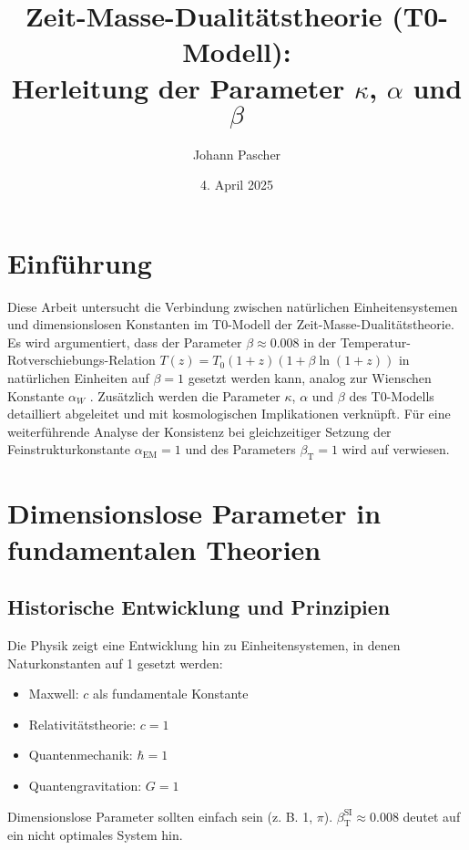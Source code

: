 \documentclass[12pt,a4paper]{article}
\newcommand{\alphaEM}{\alpha_{\text{EM}}}
\newcommand{\betaT}{\beta_{\text{T}}}
\begin{document}
	
	\title{Zeit-Masse-Dualitätstheorie (T0-Modell): \\ Herleitung der Parameter \(\kappa\), \(\alpha\) und \(\beta\)}
	\author{Johann Pascher}
	\date{4. April 2025}
	
	\maketitle
	
	\section*{Einführung}
	
	Diese Arbeit untersucht die Verbindung zwischen natürlichen Einheitensystemen und dimensionslosen Konstanten im T0-Modell der Zeit-Masse-Dualitätstheorie. Es wird argumentiert, dass der Parameter \(\beta \approx 0.008\) in der Temperatur-Rotverschiebungs-Relation \(T(z) = T_0 (1+z)(1+\beta\ln(1+z))\) in natürlichen Einheiten auf \(\beta = 1\) gesetzt werden kann, analog zur Wienschen Konstante \(\alpha_W\) \cite{pascher_temp_2025}. Zusätzlich werden die Parameter \(\kappa\), \(\alpha\) und \(\beta\) des T0-Modells detailliert abgeleitet und mit kosmologischen Implikationen verknüpft. Für eine weiterführende Analyse der Konsistenz bei gleichzeitiger Setzung der Feinstrukturkonstante \(\alphaEM = 1\) und des Parameters \(\betaT = 1\) wird auf \cite{pascher_alphabeta_2025} verwiesen.
	
	\tableofcontents
	\newpage
	
	\section{Dimensionslose Parameter in fundamentalen Theorien}
	
	\subsection{Historische Entwicklung und Prinzipien}
	
	Die Physik zeigt eine Entwicklung hin zu Einheitensystemen, in denen Naturkonstanten auf 1 gesetzt werden:
	\begin{itemize}
		\item Maxwell: \(c\) als fundamentale Konstante
		\item Relativitätstheorie: \(c = 1\)
		\item Quantenmechanik: \(\hbar = 1\)
		\item Quantengravitation: \(G = 1\)
	\end{itemize}
	Dimensionslose Parameter sollten einfach sein (z. B. 1, \(\pi\)). \(\betaT^{\text{SI}} \approx 0.008\) deutet auf ein nicht optimales System hin.
	
\end{document}

